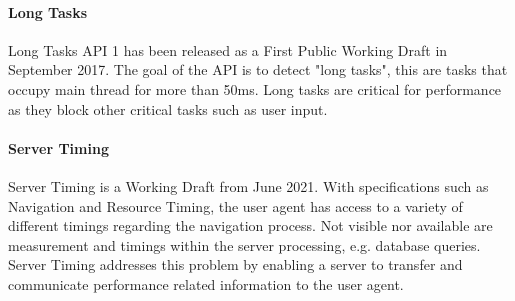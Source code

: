 	









\paragraph{Long Tasks}

Long Tasks API 1 has been released as a First Public Working Draft in September 2017.
The goal of the API is to detect "long tasks", this are tasks that occupy main thread for more than 50ms.
Long tasks are critical for performance as they block other critical tasks such as user input. %





\paragraph{Server Timing}

Server Timing is a Working Draft from June 2021.
With specifications such as Navigation and Resource Timing, the user agent has access to a variety of different timings regarding the navigation process.
Not visible nor available are measurement and timings within the server processing, e.g. database queries.
Server Timing addresses this problem by enabling a server to transfer and communicate performance related information to the user agent. %





